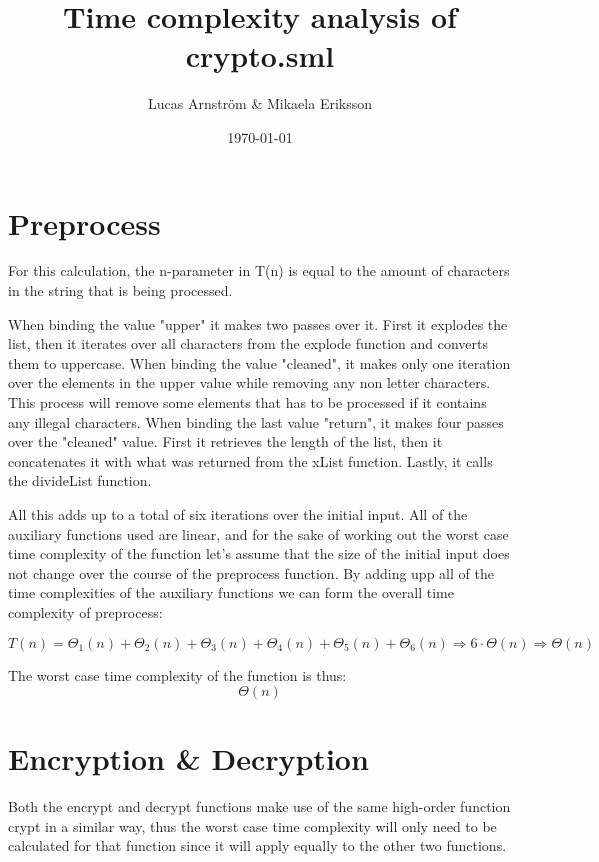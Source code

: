 ﻿\documentclass[12pt,a4paper]{article}
\title{Time complexity analysis of crypto.sml}
\author{Lucas Arnström \& Mikaela Eriksson}
\date{\today}
\begin{document}
\maketitle
\thispagestyle{empty}
\newpage

\tableofcontents
\newpage

\section{Preprocess}
For this calculation, the n-parameter in T(n) is equal to the amount of characters in the string that is being processed.

When binding the value "upper" it makes two passes over it. First it explodes the list, then it iterates over all characters from the explode function and converts them to uppercase. 
When binding the value "cleaned", it makes only one iteration over the elements in the upper value while removing any non letter characters. 
This process will remove some elements that has to be processed if it contains any illegal characters. 
When binding the last value "return", it makes four passes over the "cleaned" value. 
First it retrieves the length of the list, then it concatenates it with what was returned from the xList function. 
Lastly, it calls the divideList function.

All this adds up to a total of six iterations over the initial input. 
All of the auxiliary functions used are linear, and for the sake of working out the worst case time complexity of the function let's assume that the size of the initial input does not change over the course of the preprocess function. 
By adding upp all of the time complexities of the auxiliary functions we can form the overall time complexity of preprocess:

\begin{equation}
T(n) = \Theta_1(n) + \Theta_2(n) + \Theta_3(n) + \Theta_4(n) + \Theta_5(n) + \Theta_6(n) \Rightarrow 6 \cdot \Theta(n) \Rightarrow \Theta(n)
\end{equation}

The worst case time complexity of the function is thus:
\begin{equation}
\Theta(n)
\end{equation}

\section{Encryption \& Decryption}
Both the encrypt and decrypt functions make use of the same high-order function crypt in a similar way, thus the worst case time complexity will only need to be calculated for that function since it will apply equally to the other two functions.
\end{document}
